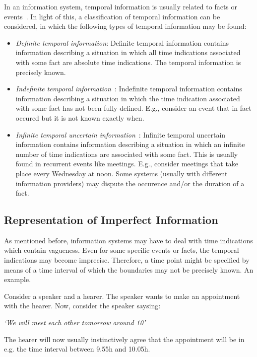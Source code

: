 In an information system, temporal information is usually related to facts or events~\cite{Chountas2000}. In light of this, a classification of temporal information can be considered, in which the following types of temporal information may be found:

\begin{itemize}
\item \emph{Definite temporal information}:
Definite temporal information contains information describing a situation in which all time indications associated with some fact are absolute time indications. The temporal information is precisely known.

\item \emph{Indefinite temporal information}~\cite{Dey1996}:
Indefinite temporal information contains information describing a situation in which the time indication associated with some fact has not been fully defined. E.g., consider an event that in fact occured but it is not known exactly when.

\item \emph{Infinite temporal uncertain information}~\cite{Kabanza1990}:
Infinite temporal uncertain information contains information describing a situation in which an infinite number of time indications are associated with some fact. This is usually found in recurrent events like meetings. E.g., consider meetings that take place every Wednesday at noon. Some systems (usually with different information providers) may dispute the occurence and/or the duration of a fact.
\end{itemize}

\subsection{\label{subsec:representation}Representation of Imperfect Information}
As mentioned before, information systems may have to deal with time indications which contain vagueness. Even for some specific events or facts, the temporal indications may become imprecise. Therefore, a time point might be specified by means of a time interval of which the boundaries may not be precisely known. An example.

\begin{example}
Consider a speaker and a hearer. The speaker wants to make an appointment with the hearer. Now, consider the speaker saysing: \\
\begin{center}
\emph{`We will meet each other tomorrow around 10'}\\
\end{center}
The hearer will now usually instinctively agree that the appointment will be in e.g. the time interval between 9.55h and 10.05h.
\end{example}

